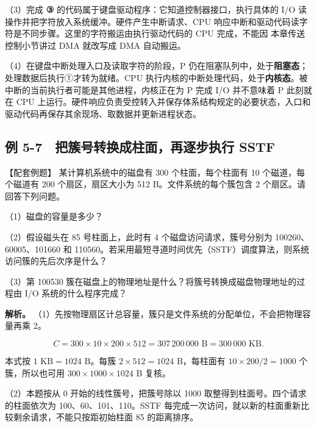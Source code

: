 （3）完成 \textbf{{\SNsymbolfont ③}} 的代码属于键盘驱动程序：它知道控制器接口，执行具体的 I/O 读操作并把字符放入系统缓冲。硬件产生中断请求、CPU 响应中断和驱动代码读字符是不同步骤。这里的字符搬运由执行驱动代码的 CPU 完成，不能因 本章传送控制小节讲过 DMA 就改写成 DMA 自动搬运。

（4）在键盘中断处理入口及读取字符的阶段，P 仍在阻塞队列中，处于\textbf{阻塞态}；处理数据后执行{\SNsymbolfont ①}才转为就绪。CPU 执行内核的中断处理代码，处于\textbf{内核态}。被中断的当前执行者可能是其他进程，内核正在为 P 完成 I/O 并不意味着 P 此刻就在 CPU 上运行。硬件响应负责受控转入并保存体系结构规定的必要状态，入口和驱动代码再保存其余现场、取数据并更新进程状态。

\subsection{例 5-7　把簇号转换成柱面，再逐步执行 SSTF}\label{OS05-ex7-7}

\begin{example}[配套例题]

【配套例题】 某计算机系统中的磁盘有 300 个柱面，每个柱面有 10 个磁道，每个磁道有 200 个扇区，扇区大小为 512 B。文件系统的每个簇包含 2 个扇区。请回答下列问题。

（1）磁盘的容量是多少？

（2）假设磁头在 85 号柱面上，此时有 4 个磁盘访问请求，簇号分别为 100260、60005、101660 和 110560。若采用最短寻道时间优先（SSTF）调度算法，则系统访问簇的先后次序是什么？

（3）第 100530 簇在磁盘上的物理地址是什么？将簇号转换成磁盘物理地址的过程由 I/O 系统的什么程序完成？

\end{example}

\textbf{解析。} （1）先按物理扇区计总容量，簇只是文件系统的分配单位，不会把物理容量再乘 2。

\[C=300\times10\times200\times512=307\,200\,000\text{ B}=300\,000\text{ KB}.\]

本式按 \(1\text{ KB}=1024\text{ B}\)。每簇 \(2\times512=1024\) B，每柱面有 \(10\times200/2=1000\) 个簇，所以也可用 \(300\times1000\times1024\) B 复核。

（2）本题按从 0 开始的线性簇号，把簇号除以 1000 取整得到柱面号。四个请求的柱面依次为 100、60、101、110。SSTF 每完成一次访问，就以新的柱面重新比较剩余请求，不能只按距初始柱面 85 的距离排序。

